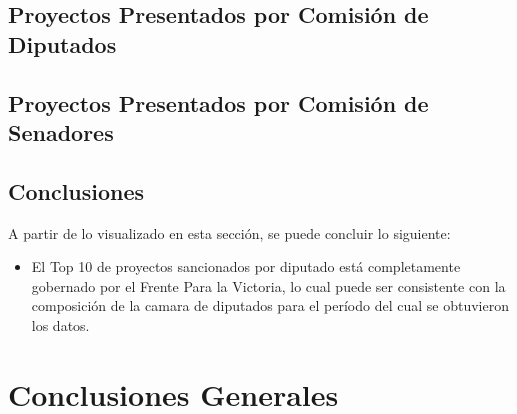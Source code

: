 \documentclass[12pt,a4paper,titlepage]{article}
\begin{document}
  \subsection{Proyectos Presentados por Comisión de Diputados}
  
  \subsection{Proyectos Presentados por Comisión de Senadores}
  
  \subsection{Conclusiones}
    A partir de lo visualizado en esta sección, se puede concluir lo siguiente:
    
    \begin{itemize}
    	\item El Top 10 de proyectos sancionados por diputado está completamente gobernado por el Frente Para la Victoria, lo cual puede ser consistente con la composición de la camara de diputados para el período del cual se obtuvieron los datos.
    	
    \end{itemize}
  

  \section{Conclusiones Generales}\label{section:conclusions}
  
\end{document}

